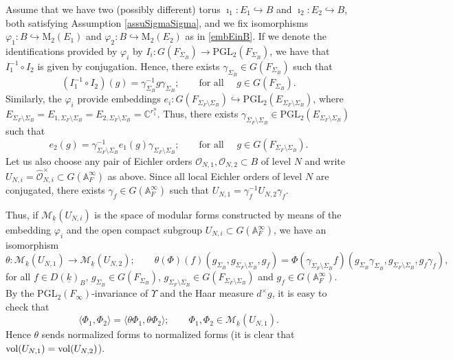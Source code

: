 \documentclass{amsart}
\theoremstyle{definition}
\theoremstyle{remark}
\numberwithin{equation}{section}
\newcommand{\M}{\mathrm{M}}
\newcommand{\PGL}{{\mathrm{PGL}}}
\newcommand{\A}{{\mathbb A}}
\newcommand{\C}{{\mathbb C}}
\newcommand{\cM}{{\mathcal M}}
\newcommand{\cO}{{\mathcal O}}
\begin{document}
Assume that we have two (possibly different) torus $\imath_1:E_1\hookrightarrow B$ and $\imath_2:E_2\hookrightarrow B$, both satisfying Assumption \ref{assuSigmaSigma}, and we fix isomorphisms $\varphi_1:B\hookrightarrow\M_2(E_1)$ and $\varphi_2:B\hookrightarrow\M_2(E_2)$ as in \eqref{embEinB}. If we denote the identifications provided by $\varphi_i$ by $I_i:G(F_{\Sigma_B})\rightarrow\PGL_2(F_{\Sigma_B})$, we have that $I_1^{-1}\circ I_2$ is given by conjugation. Hence, there exists $\gamma_{\Sigma_B}\in G(F_{\Sigma_B})$ such that
\[
(I_1^{-1}\circ I_2)(g)=\gamma_{\Sigma_B}^{-1}g\gamma_{\Sigma_B};\qquad\mbox{for all }\quad g\in G(F_{\Sigma_B}).
\]
Similarly, the $\varphi_i$ provide embeddings $e_i:G(F_{\Sigma_F\setminus\Sigma_B})\hookrightarrow \PGL_2(E_{\Sigma_F\setminus\Sigma_B})$, where $E_{\Sigma_F\setminus\Sigma_B}=E_{1,\Sigma_F\setminus\Sigma_B}=E_{2,\Sigma_F\setminus\Sigma_B}=\C^{r_1^n}$. Thus, there exists $\gamma_{\Sigma_F\setminus\Sigma_B}\in\PGL_2(E_{\Sigma_F\setminus\Sigma_B})$ such that 
\[
e_2(g)=\gamma_{\Sigma_F\setminus\Sigma_B}^{-1}e_1(g)\gamma_{\Sigma_F\setminus\Sigma_B};\qquad\mbox{for all }\quad g\in G(F_{\Sigma_F\setminus\Sigma_B}).
\]
Let us also choose any pair of Eichler orders $\cO_{N,1},\cO_{N,2}\subset B$ of level $N$ and write $U_{N,i}=\hat\cO_{N,i}^\times\subset G(\A_F^\infty)$ as above.
Since all local Eichler orders of level $N$ are conjugated, there exists $\gamma_f\in G(\A_F^\infty)$ such that $U_{N,1}=\gamma_f^{-1}U_{N,2}\gamma_f$.

Thus, if $\cM_{\underline k}(U_{N,i})$ is the space of modular forms constructed by means of the embedding $\varphi_i$ and the open compact subgroup $U_{N,i}\subset G(\A_F^\infty)$, we have an isomorphism
\begin{equation}\label{deftheta}
\theta:\cM_{\underline k}(U_{N,1})\longrightarrow \cM_{\underline k}(U_{N,2});\qquad \theta(\Phi)(f)(g_{\Sigma_B},g_{\Sigma_F\setminus\Sigma_B},g_f)=\Phi(\gamma_{\Sigma_F\setminus\Sigma_B}f)(g_{\Sigma_B}\gamma_{\Sigma_B},g_{\Sigma_F\setminus\Sigma_B},g_f\gamma_f),
\end{equation}
for all $f\in D(\underline k)_B$, $g_{\Sigma_B}\in G(F_{\Sigma_B})$, $g_{\Sigma_F\setminus\Sigma_B}\in G(F_{\Sigma_F\setminus\Sigma_B})$ and $g_f\in G(\A_F^\infty)$. By the $\PGL_2(F_\infty)$-invariance of $\Upsilon$ and the Haar measure $d^\times g$, it is easy to check that
\begin{equation}\label{eqindemb}
    \langle\Phi_1,\Phi_2\rangle=\langle\theta\Phi_1,\theta\Phi_2\rangle;\qquad \Phi_1,\Phi_2\in \cM_{\underline k}(U_{N,1}).
\end{equation}
Hence $\theta$ sends normalized forms to normalized forms (it is clear that ${\rm vol}(U_{N,1})={\rm vol}(U_{N,2})$). 
\end{document}
